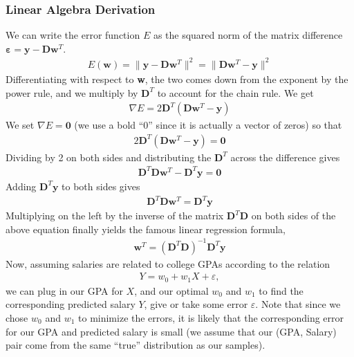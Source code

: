 \documentclass[11pt,letterpaper]{article}
\newcommand\eps{\varepsilon}
\numberwithin{theorem}{section}
\numberwithin{definition}{section}
\numberwithin{lemma}{section}
\numberwithin{corollary}{section}
\numberwithin{proposition}{section}
\theoremstyle{definition}
\numberwithin{remark}{section}
\numberwithin{claim}{section}
\numberwithin{observation}{section}
\numberwithin{fact}{section}
\numberwithin{assumption}{section}
\numberwithin{example}{section}
\numberwithin{exercise}{section}
\begin{document}
\subsubsection{Linear Algebra Derivation}
We can write the error function $E$ as the squared norm of the matrix difference $\boldsymbol{\eps} = \textbf{y} - \textbf{D}\textbf{w}^T$.
\begin{align*}
E(\textbf{w}) = \|\textbf{y} - \textbf{D}\textbf{w}^T\|^2 = \|\textbf{D}\textbf{w}^T-\textbf{y} \|^2
\end{align*}
Differentiating with respect to \textbf{w}, the two comes down from the exponent by the power rule, and we multiply by $\textbf{D}^T$ to account for the chain rule. We get
\begin{align*}
\nabla E = 2 \textbf{D}^T (\textbf{D}\textbf{w}^T - \textbf{y})
\end{align*}
We set $\nabla E = \textbf{0}$ (we use a bold ``0'' since it is actually a vector of zeros) so that
\begin{align*}
2 \textbf{D}^T (\textbf{D}\textbf{w}^T - \textbf{y}) = \textbf{0}
\end{align*}
Dividing by 2 on both sides and distributing the $\textbf{D}^T$ across the difference gives
\begin{align*}
\textbf{D}^T \textbf{D} \textbf{w}^T - \textbf{D}^T \textbf{y} = \textbf{0}
\end{align*}
Adding $\textbf{D}^T \textbf{y}$ to both sides gives
\begin{align*}
\textbf{D}^T \textbf{D} \textbf{w}^T = \textbf{D}^T \textbf{y} 
\end{align*}
Multiplying on the left by the inverse of the matrix $\textbf{D}^T \textbf{D}$ on both sides of the above equation finally yields the famous linear regression formula,
\begin{align*}
\textbf{w}^T = (\textbf{D}^T \textbf{D})^{-1} \textbf{D}^T \textbf{y}
\end{align*}
Now, assuming salaries are related to college GPAs according to the relation
\begin{align*}
Y = w_0 + w_1 X + \eps,
\end{align*}
we can plug in our GPA for $X$, and our optimal $w_0$ and $w_1$ to find the corresponding predicted salary $Y$, give or take some error $\eps$. Note that since we chose $w_0$ and $w_1$ to minimize the errors, it is likely that the corresponding error for our GPA and predicted salary is small (we assume that our (GPA, Salary) pair come from the same ``true'' distribution as our samples).
\end{document}
